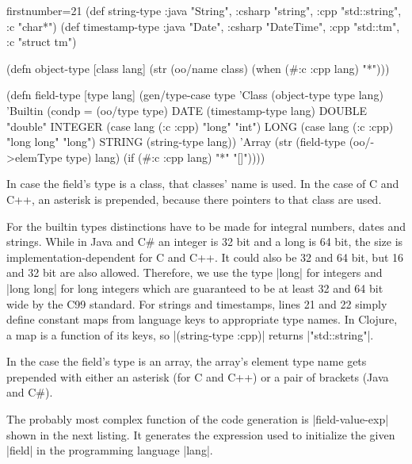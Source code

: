 \documentclass[a4paper]{article}
\newcommand{\code}{\clojureinline}
\begin{document}
\begin{clojurecode*}{firstnumber=21}
(def string-type {:java "String", :csharp "string", :cpp "std::string", :c "char*"})
(def timestamp-type {:java "Date", :csharp "DateTime", :cpp "std::tm", :c "struct tm"})

(defn object-type [class lang]
  (str (oo/name class) (when (#{:c :cpp} lang) "*")))

(defn field-type [type lang]
  (gen/type-case type
    'Class   (object-type type lang)
    'Builtin (condp = (oo/type type)
               DATE    (timestamp-type lang)
               DOUBLE  "double"
               INTEGER (case lang (:c :cpp) "long"      "int")
               LONG    (case lang (:c :cpp) "long long" "long")
               STRING  (string-type lang))
    'Array   (str (field-type (oo/->elemType type) lang)
                  (if (#{:c :cpp} lang) "*" "[]"))))
\end{clojurecode*}

In case the field's type is a class, that classes' name is used.  In the case
of C and C++, an asterisk is prepended, because there pointers to that class
are used.

For the builtin types distinctions have to be made for integral numbers, dates
and strings.  While in Java and C\# an integer is 32 bit and a long is 64 bit,
the size is implementation-dependent for C and C++.  It could also be 32 and 64
bit, but 16 and 32 bit are also allowed.  Therefore, we use the type
\cinline|long| for integers and \cinline|long long| for long integers which are
guaranteed to be at least 32 and 64 bit wide by the C99 standard.  For strings
and timestamps, lines 21 and 22 simply define constant maps from language keys
to appropriate type names.  In Clojure, a map is a function of its keys, so
\code|(string-type :cpp)| returns \code|"std::string"|.

In the case the field's type is an array, the array's element type name gets
prepended with either an asterisk (for C and C++) or a pair of brackets (Java
and C\#).

The probably most complex function of the code generation is
\code|field-value-exp| shown in the next listing.  It generates the expression
used to initialize the given \code|field| in the programming language
\code|lang|.
\end{document}
